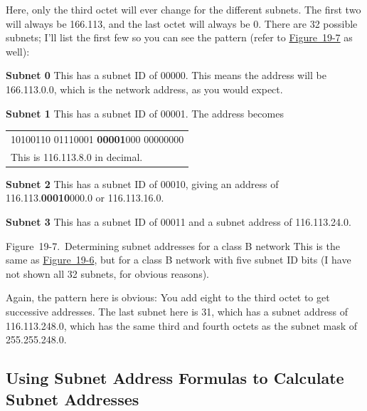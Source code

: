 \documentclass[b5paper,11pt]{memoir}
\begin{document}
Here, only the third octet will ever change for the different subnets.
The first two will always be 166.113, and the last octet will always be
0. There are 32 possible subnets; I'll list the first few so you can see
the pattern (refer to
\protect\hyperlink{ch19s04.htmlux5cux23determining_subnet_addresses_for_a-id001}{Figure~19-7}
as well):

{\textbf{Subnet 0}} This has a subnet ID of 00000. This means the
address will be 166.113.0.0, which is the network address, as you would
expect.

{\textbf{Subnet 1}} This has a subnet ID of 00001. The address becomes

\begin{longtable}[]{@{}l@{}}
\toprule
\endhead
10100110 01110001 {\textbf{00001}}000 00000000\tabularnewline
This is 116.113.8.0 in decimal.\tabularnewline
\bottomrule
\end{longtable}

{\textbf{Subnet 2}} This has a subnet ID of 00010, giving an address of
116.113.{\textbf{00010}}000.0 or 116.113.16.0.

{\textbf{Subnet 3}} This has a subnet ID of 00011 and a subnet address
of 116.113.24.0.

\protect\hypertarget{ch19s04.htmlux5cux23determining_subnet_addresses_for_a-id001}{}{}

\protect\hypertarget{ch19s04.htmlux5cux23I_mediaobject5_d1e21014}{}{}

Figure~19-7.~Determining subnet addresses for a class B network This is
the same as
\protect\hyperlink{ch19s04.htmlux5cux23determining_subnet_addresses_for_a_class}{Figure~19-6},
but for a class B network with five subnet ID bits (I have not shown all
32 subnets, for obvious reasons).

\protect\hypertarget{ch19s04.htmlux5cux23idx-CHP-19-0751}{}{}Again, the
pattern here is obvious: You add eight to the third octet to get
successive addresses. The last subnet here is 31, which has a subnet
address of 116.113.248.0, which has the same third and fourth octets as
the subnet mask of 255.255.248.0.

\subsection[Using Subnet Address Formulas to Calculate Subnet
Addresses]{\texorpdfstring{\protect\hypertarget{ch19s04.htmlux5cux23using_subnet_address_formulas_to_calcula}{}{}Using
Subnet Address Formulas to Calculate Subnet
Addresses}{Using Subnet Address Formulas to Calculate Subnet Addresses}}
\end{document}
